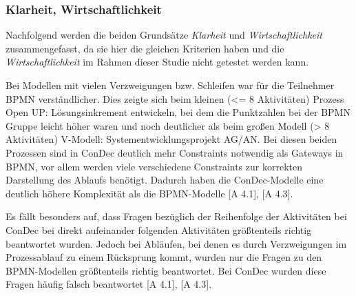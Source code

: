 \subsubsection{Klarheit, Wirtschaftlichkeit}



Nachfolgend werden die beiden Grundsätze \textit{Klarheit} und \textit{Wirtschaftlichkeit} zusammengefasst, da sie hier die gleichen Kriterien haben und die \textit{Wirtschaftlichkeit} im Rahmen dieser Studie nicht getestet werden kann.\newline

Bei Modellen mit vielen Verzweigungen bzw. Schleifen war für die Teilnehmer BPMN verständlicher. Dies zeigte sich beim kleinen (<= 8 Aktivitäten) Prozess \grqq Open UP: Lösungsinkrement entwickeln\grqq, bei dem die Punktzahlen bei der BPMN Gruppe leicht höher waren und noch deutlicher als beim großen Modell (> 8 Aktivitäten) \grqq V-Modell: Systementwicklungsprojekt AG/AN\grqq. Bei diesen beiden Prozessen sind in ConDec deutlich mehr Constraints notwendig als Gateways in BPMN, vor allem werden viele verschiedene Constraints zur korrekten Darstellung des Ablaufs benötigt. Dadurch haben die ConDec-Modelle eine deutlich höhere Komplexität als die BPMN-Modelle [A 4.1], [A 4.3].\newline

Es fällt besonders auf, dass Fragen bezüglich der Reihenfolge der Aktivitäten bei ConDec bei direkt aufeinander folgenden Aktivitäten größtenteils richtig beantwortet wurden. Jedoch bei Abläufen, bei denen es durch Verzweigungen im Prozessablauf zu einem Rücksprung kommt, wurden nur die Fragen zu den BPMN-Modellen größtenteils richtig beantwortet. Bei ConDec wurden diese Fragen häufig falsch beantwortet [A 4.1], [A 4.3].\newline

